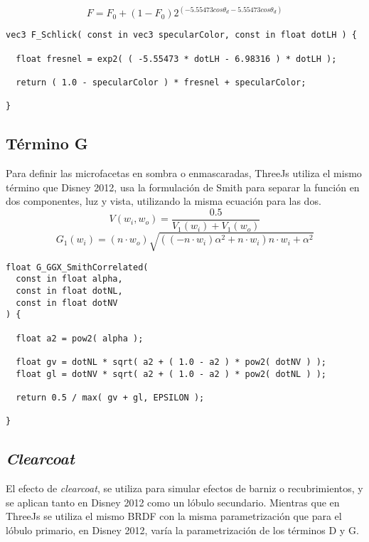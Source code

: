   \begin{equation}
    F= F_0 + (1 - F_0)2^{(-5.55473cos\theta_d - 5.55473cos\theta_d)}
  \end{equation}
  \begin{eqfloat}


  \begin{lstlisting}[caption=Implementaci\'on en ThreeJs de la aproximaci\'on a la funci\'on de Fresnel]
vec3 F_Schlick( const in vec3 specularColor, const in float dotLH ) {

  float fresnel = exp2( ( -5.55473 * dotLH - 6.98316 ) * dotLH );

  return ( 1.0 - specularColor ) * fresnel + specularColor;

}
  \end{lstlisting}

  \subsection*{T\'ermino G}
  Para definir las microfacetas en sombra o enmascaradas, ThreeJs utiliza el mismo t\'ermino que Disney 2012, usa
  la formulaci\'on de Smith para separar la funci\'on en dos componentes, luz y vista, utilizando la misma ecuaci\'on
  para las dos.\\

  $$
  V(w_i, w_o) = \frac{0.5}{V_1(w_i) + V_1(w_o)}
  $$
  \singlespacing
  \begin{equation}
    G_1(w_i) = (n \cdot{w_o}) \sqrt{((-n\cdot{w_i}) \alpha^2 + n\cdot{w_i}) n\cdot{w_i} + \alpha^2}
  \end{equation}



\begin{lstlisting}[caption=Clase MeshClothMaterial]
float G_GGX_SmithCorrelated(
  const in float alpha,
  const in float dotNL,
  const in float dotNV
) {

  float a2 = pow2( alpha );

  float gv = dotNL * sqrt( a2 + ( 1.0 - a2 ) * pow2( dotNV ) );
  float gl = dotNV * sqrt( a2 + ( 1.0 - a2 ) * pow2( dotNL ) );

  return 0.5 / max( gv + gl, EPSILON );

}
\end{lstlisting}

  \subsection*{\textit{Clearcoat}}
  El efecto de \textit{clearcoat}, se utiliza para simular efectos de barniz o recubrimientos, y se aplican tanto en Disney
  2012 como un l\'obulo secundario. Mientras que en ThreeJs se utiliza el mismo BRDF con la misma parametrizaci\'on que para
  el l\'obulo primario, en Disney 2012, var\'ia la parametrizaci\'on de los t\'erminos D y G.\\


\end{eqfloat}
